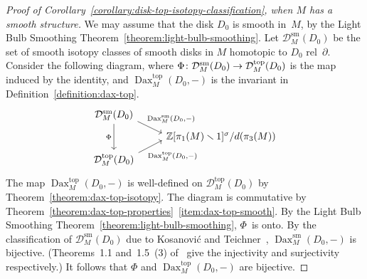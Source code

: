 \documentclass[11pt]{amsart}
\def\to{\mathchoice{\longrightarrow}{\rightarrow}{\rightarrow}{\rightarrow}}
\theoremstyle{definition}
\theoremstyle{theorem-giventitle}
\theoremstyle{definition-giventitle}
\numberwithin{equation}{section}
\def\Z{\mathbb{Z}}
\def\cD{\mathcal{D}}
\def\sm{\mathrm{sm}}
\def\top{\mathrm{top}}
\def\Dax{\operatorname{Dax}}
\def\setminus{\smallsetminus}
\begin{document}
\begin{proof}[Proof of Corollary~\ref{corollary:disk-top-isotopy-classification}, when $M$ has a smooth structure]
  We may assume that the disk $D_0$ is smooth in~$M$, by the Light Bulb Smoothing Theorem~\ref{theorem:light-bulb-smoothing}\@.
  Let $\cD^\sm_M(D_0)$ be the set of smooth isotopy classes of smooth disks in $M$ homotopic to $D_0$ rel~$\partial$.
  Consider the following diagram, where $\Phi\colon \cD^\sm_M(D_0) \to \cD^\top_M(D_0)$ is the map induced by the identity, and $\Dax^\top_M(D_0,-)$ is the invariant in Definition~\ref{definition:dax-top}.
  \[
    \begin{tikzcd}[row sep=tiny]
      \cD^\sm_M(D_0) \ar[dd,"\Phi"']
        \ar[rd,"{\Dax^\sm_M(D_0,-)}",end anchor={[yshift=-1.2ex]north west},pos=.3]
      \\
      & \Z[\pi_1(M)\setminus 1]^\sigma / d(\pi_3(M))
      \\
      \cD^\top_M(D_0)
        \ar[ru,"{\Dax^\top_M(D_0,-)}"',end anchor={[yshift=1.2ex]south west},pos=.3]
    \end{tikzcd}  
  \]
  The map $\Dax^\top_M(D_0,-)$ is well-defined on $\cD^\top_M(D_0)$ by Theorem~\ref{theorem:dax-top-isotopy}.
  The diagram is commutative by Theorem~\ref{theorem:dax-top-properties}~\ref{item:dax-top-smooth}.
  By the Light Bulb Smoothing Theorem~\ref{theorem:light-bulb-smoothing}, $\Phi$~is onto.
  By the classification of $\cD^\sm_M(D_0)$ due to Kosanovi\'c and Teichner~\cite{Kosanovic-Teichner:2024-2}, $\Dax^\sm_M(D_0,-)$ is bijective.
  (Theorems~1.1 and~1.5~(3) of~\cite{Kosanovic-Teichner:2024-2} give the injectivity and surjectivity respectively.)
  It follows that $\Phi$ and $\Dax^\top_M(D_0,-)$ are bijective.
\end{proof}
\end{document}
